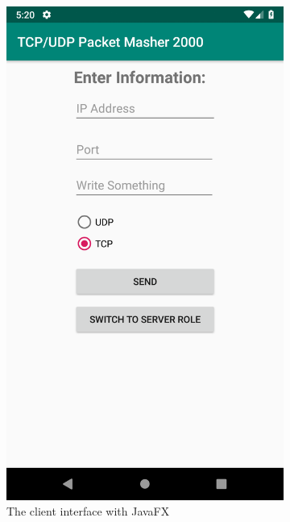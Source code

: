 \begin{figure}[H]
	\centering
	\begin{subfigure}{.49\textwidth}
		\centering
		\includegraphics[width=0.75\linewidth]{images/task1/clientAndroid.png}
		\caption{The client interface with JavaFX}
		\label{fig:clientAndroid}
	\end{subfigure}%
	\begin{subfigure}{.49\textwidth}
		\centering

\end{subfigure}
\end{figure}
